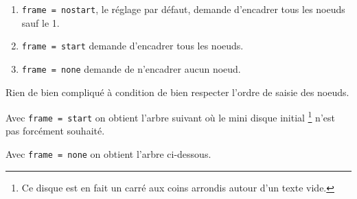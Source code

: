 \documentclass[12pt,a4paper]{article}
\begin{document}
\begin{enumerate}
	\item \verb#frame = nostart#, le réglage par défaut, demande d'encadrer tous les noeuds sauf le 1\ier{}.
	
	\item \verb#frame = start# demande d'encadrer tous les noeuds.

	\item \verb#frame = none# demande de n'encadrer aucun noeud.
\end{enumerate}






Rien de bien compliqué à condition de bien respecter l'ordre de saisie des noeuds.



Avec \verb#frame = start# on obtient l'arbre suivant où le mini disque initial
\footnote{
	Ce disque est en fait un carré aux coins arrondis autour d'un texte vide.
}
n'est pas forcément souhaité.




Avec \verb#frame = none# on obtient l'arbre ci-dessous.







%



\end{document}
